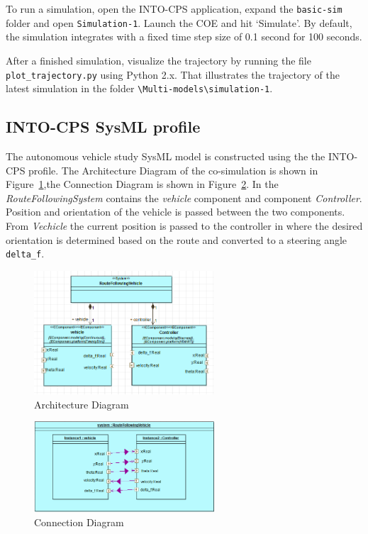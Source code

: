 To run a simulation, open the INTO-CPS application, expand the \texttt{basic-sim} folder and open \texttt{Simulation-1}. Launch the COE and hit `Simulate'. 
By default, the simulation integrates with a fixed time step size of 0.1 second for 100 seconds. \newline

After a finished simulation, visualize the trajectory by running the file \texttt{plot\_trajectory.py} using Python 2.x. That illustrates the trajectory of the latest simulation in the folder \texttt{\textbackslash Multi-models\textbackslash si\-mu\-la\-tion-1}.

\subsection{INTO-CPS SysML profile}
The autonomous vehicle study SysML model is constructed using the the INTO-CPS profile. The Architecture Diagram of the co-simulation is shown in Figure~\ref{fig:bicycle_architecture_diagram},the Connection Diagram is shown in Figure~\ref{fig:bicycle_connection_diagram}.
In the \textit{RouteFollowingSystem} contains the \textit{vehicle} component and component \textit{Controller}. Position and orientation of the vehicle is passed between the two components. From \textit{Vechicle} the current position is passed to the controller in where the desired orientation is determined based on the route and converted to a steering angle \texttt{delta\_f}. 
	\begin{figure}[htbp]
	\begin{center}
		\includegraphics[width=0.6\textwidth]{vehicle/architecture_structure_diagram.png}
		\caption{Architecture Diagram}
		\label{fig:bicycle_architecture_diagram}
	\end{center}
\end{figure}
\begin{figure}[htbp]
	\begin{center}
		\includegraphics[width=0.6\textwidth]{vehicle/connection_diagram.png}
		\caption{Connection Diagram}
		\label{fig:bicycle_connection_diagram}
	\end{center}
\end{figure}

